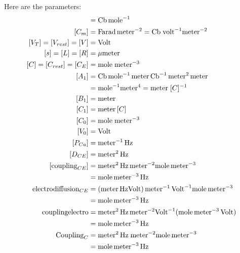 \documentclass{article}
\begin{document}
Here are the parameters: 
\begin{align}
[F] &= \text{Cb} \, \mole^{-1}   \\
[C_m] &= \text{Farad} \, \meter^{-2}  = \text{Cb} \; \text{volt}^{-1} \meter^{-2} \\
[V_T] = [V_{rest}] = [V] &= \text{Volt} \\
[s] = [L] = [R] &= \mu\meter \\
[C] = [C_{rest}] = [C_E] &= \mole \; \meter^{-3} \\
[A_1] &= \text{Cb} \, \mole^{-1} \, \meter \, \text{Cb}^{-1} \, \meter^2 \,\meter  \\
   &= \mole^{-1} \meter^4  = \meter \; [C]^{-1} \\
[B_1] &= \meter \\
[C_1] &=  \meter \, [C] \\
[C_0] &=  \mole \; \meter^{-3} \\
[V_0] &= \text{Volt} \\
[P_{Ca}] &= \meter^{-1} \, \Hz \\
[D_{CE}] &= \meter^2 \, \Hz  \\
[\couplingCe] &= \meter^2\,\Hz \, \meter^{-2} \mole \, \meter^{-3} \\
    &= \mole \, \meter^{-3} \, \Hz \\
\electrodiffusion &= (\meter \,\Hz \text{Volt}) \,\meter^{-1} \,\text{Volt}^{-1} \mole\,\meter^{-3} \\ 
    &= \mole \, \meter^{-3} \, \Hz \\
\couplingelectro  &= \meter^2\,\Hz \, \meter^{-2} \text{Volt}^{-1}   (\mole\,\meter^{-3}\,\text{Volt}) \\
                  &= \mole \, \meter^{-3} \, \Hz \\
\couplingC        &= \meter^2\,\Hz \; \meter^{-2} \mole \, \meter^{-3} \\
                  &= \mole \, \meter^{-3} \, \Hz \\
\end{align}
\end{document}
